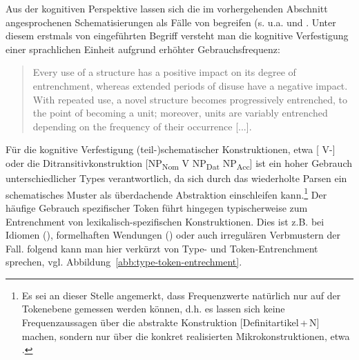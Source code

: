 \begin{sloppypar}Aus der kognitiven Perspektive lassen sich die im vorhergehenden Abschnitt angesprochenen Schematisierungen als Fälle von  begreifen (s. u.a. \citealt{Langacker1987,Langacker2008,Goldberg1995,Goldberg2006,Bybee2006,Bybee2010} und \citealt{Schmid2007,Schmid2016}. 
Unter diesem erstmals von \citeauthor{Langacker1987} eingeführten Begriff versteht man die kognitive Verfestigung einer sprachlichen Einheit aufgrund erhöhter Gebrauchsfrequenz:\end{sloppypar}\blockcquote[59]{Langacker1987}{Every use of a structure has a positive impact on its degree of entrenchment, whereas extended periods of disuse have a negative impact. With repeated use, a novel structure becomes progressively entrenched, to the point of becoming a unit; moreover, units are variably entrenched depending on the frequency of their occurrence [...].} 

Für die kognitive Verfestigung (teil-)schematischer Konstruktionen, 
etwa [ V-] \parencite{Flick2016} oder die Ditransitivkonstruktion   [NP\textsubscript{Nom} V NP\textsubscript{Dat} NP\textsubscript{Acc}] \parencite{Goldberg2006} ist ein hoher Gebrauch unterschiedlicher Types verantwortlich, da sich durch das wiederholte Parsen ein schematisches Muster als überdachende Abstraktion einschleifen kann.\footnote{Es sei an dieser Stelle angemerkt, dass Frequenzwerte natürlich nur auf der Tokenebene gemessen werden können, d.h. es lassen sich keine Frequenzaussagen über die abstrakte Konstruktion   [Definitartikel\,+\,N] machen, sondern nur über die konkret realisierten Mikrokonstruktionen, etwa .} 
Der häufige Gebrauch spezifischer Token führt hingegen typischerweise zum Entrenchment von lexikalisch-spe\-zi\-fisch\-en Konstruktionen. Dies ist z.B. bei Idiomen (), formelhaften Wendungen () oder auch irregulären Verbmustern der Fall. \textcite[103--104]{Ziem2013} folgend kann man hier verkürzt von Type- und Token-Entrenchment sprechen, vgl. Abbildung~\ref{abb:type-token-entrechment}.


